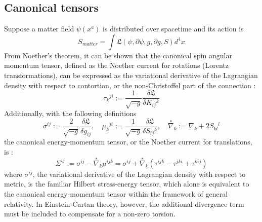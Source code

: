\documentclass[12pt]{article}
\begin{document}
\subsection{Canonical tensors}
Suppose a matter field $\psi(x^a)$ is distributed over spacetime and its action is
\[ S_{matter} = \int \mathfrak{L}(\psi,\partial\psi, g,\partial g, S) d^4x \]
From Noether's theorem, it can be shown that the canonical spin angular momentum tensor, defined as the Noether current for rotations (Lorentz transformations), can be expressed as the variational derivative of the Lagrangian density with respect to contortion, or the non-Christoffel part of the connection \cite{hehl1976general}:
\[\tau_k{}^{ji} := \frac{1}{\sqrt{-g}}\frac{\delta\mathfrak{L}}{\delta K_{ij}{}^k}\]
Additionally, with the following definitions
\[ \sigma^{ij} := \frac{2}{\sqrt{-g}}\frac{\delta\mathfrak{L}}{\delta g_{ij}},
\quad \mu_{k}{}^{ji} := \frac{1}{\sqrt{-g}}\frac{\delta\mathfrak{L}}{\delta S_{ij}{}^k},
\quad \stackrel{*}{\nabla}_k := \nabla_k + 2S_{kl}{}^l\]
the canonical energy-momentum tensor, or the Noether current for translations, is \cite{hehl1976general}:
 \[ \Sigma^{ij} := \sigma^{ij} - \stackrel{*}{\nabla}_k\mu^{ijk}  = \sigma^{ij} + \stackrel{*}{\nabla}_k(\tau^{ijk} - \tau^{jki} + \tau^{kij})\]
where $\sigma^{ij}$, the variational derivative of the Lagrangian density with respect to metric, is the familiar Hilbert stress-energy tensor, which alone is equivalent to the canonical energy-momentum tensor within the framework of general relativity. In Einstein-Cartan theory, however, the additional divergence term must be included to compensate for a non-zero torsion.
\end{document}
